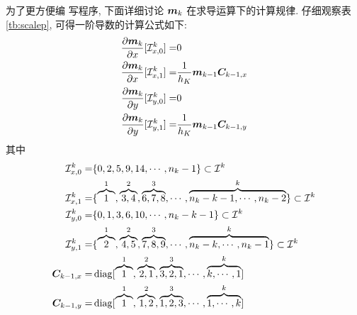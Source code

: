 \documentclass{article}
\begin{document}
 为了更方便编 写程序, 下面详细讨论 ${\boldsymbol m}_k$ 在求导运算下的计算规律. 仔细观察表
\ref{tb:scalep},  可得一阶导数的计算公式如下:
\begin{align*}
    \frac{\partial{\boldsymbol m}_k}{\partial x}[{\mathcal I}_{x, 0}^k] =&  0 \\
    \frac{\partial{\boldsymbol m}_k}{\partial x}[{\mathcal I}_{x, 1}^k] =& \frac{1}{h_K}{\boldsymbol m}_{k-1}{\boldsymbol C}_{k-1, x}  \\
    \frac{\partial{\boldsymbol m}_k}{\partial y}[{\mathcal I}_{y, 0}^k] =&  0 \\
    \frac{\partial{\boldsymbol m}_k}{\partial y}[{\mathcal I}_{y, 1}^k] =& \frac{1}{h_K}{\boldsymbol m}_{k-1}{\boldsymbol C}_{k-1, y}  \\
\end{align*}
其中
\begin{align*}
    {\mathcal I}_{x, 0}^k = &\{0, 2, 5, 9, 14, \cdots, n_k-1\} \subset {\mathcal I}^k\\
    {\mathcal I}_{x, 1}^k = &\{
        \overbrace{1}^1, 
        \overbrace{3, 4}^2, 
        \overbrace{6, 7, 8}^3, 
        \cdots, 
        \overbrace{n_k - k-1, \cdots, n_k - 2}^{k}\}\subset {\mathcal I}^k\\
    {\mathcal I}_{y, 0}^k = &\{0, 1, 3, 6, 10, \cdots, n_k-k-1\}\subset {\mathcal I}^k\\
    {\mathcal I}_{y, 1}^k = &\{
        \overbrace{2}^1, 
        \overbrace{4, 5}^2, 
        \overbrace{7, 8, 9}^3, 
        \cdots, 
        \overbrace{n_k-k, \cdots, n_k - 1}^{k}\} \subset {\mathcal I}^k\\
    {\boldsymbol C}_{k-1, x} = &\operatorname{diag}[
        \overbrace{1}^1, 
        \overbrace{2, 1}^2, 
        \overbrace{3, 2, 1}^3, 
        \cdots, 
        \overbrace{k, \cdots, 1}^{k}] \\
    {\boldsymbol C}_{k-1, y} = &\operatorname{diag}[
        \overbrace{1}^1, 
        \overbrace{1, 2}^2, 
        \overbrace{1, 2, 3}^3, 
        \cdots, 
    \overbrace{1, \cdots, k}^{k}] \\
\end{align*}
\end{document}
